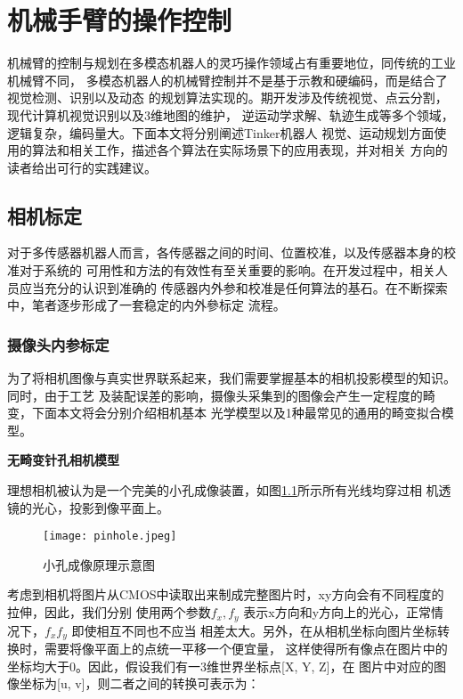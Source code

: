 \chapter{机械手臂的操作控制}
\label{cha:chapter04}

机械臂的控制与规划在多模态机器人的灵巧操作领域占有重要地位，同传统的工业机械臂不同，
多模态机器人的机械臂控制并不是基于示教和硬编码，而是结合了视觉检测、识别以及动态
的规划算法实现的。期开发涉及传统视觉、点云分割，现代计算机视觉识别以及3维地图的维护，
逆运动学求解、轨迹生成等多个领域，逻辑复杂，编码量大。下面本文将分别阐述Tinker机器人
视觉、运动规划方面使用的算法和相关工作，描述各个算法在实际场景下的应用表现，并对相关
方向的读者给出可行的实践建议。

\section{相机标定}

对于多传感器机器人而言，各传感器之间的时间、位置校准，以及传感器本身的校准对于系统的
可用性和方法的有效性有至关重要的影响。在开发过程中，相关人员应当充分的认识到准确的
传感器内外参和校准是任何算法的基石。在不断探索中，笔者逐步形成了一套稳定的内外參标定
流程。

\subsection{摄像头内参标定}
\label{subsec:cam_intrinsic}

为了将相机图像与真实世界联系起来，我们需要掌握基本的相机投影模型的知识。同时，由于工艺
及装配误差的影响，摄像头采集到的图像会产生一定程度的畸变，下面本文将会分别介绍相机基本
光学模型以及1种最常见的通用的畸变拟合模型。

\noindent \textbf{无畸变针孔相机模型}

理想相机被认为是一个完美的小孔成像装置，如图\ref{fig:pinhole}所示所有光线均穿过相
机透镜的光心，投影到像平面上。

\begin{figure}[h] %
  \centering
  \texttt{[image: pinhole.jpeg]}
  \caption{小孔成像原理示意图}
  \label{fig:pinhole}
\end{figure}

考虑到相机将图片从CMOS中读取出来制成完整图片时，xy方向会有不同程度的拉伸，因此，我们分别
使用两个参数$f_x, f_y$ 表示x方向和y方向上的光心，正常情况下，$f_x f_y$ 即使相互不同也不应当
相差太大。另外，在从相机坐标向图片坐标转换时，需要将像平面上的点统一平移一个便宜量，
这样使得所有像点在图片中的坐标均大于0。因此，假设我们有一3维世界坐标点[X, Y, Z]，在
图片中对应的图像坐标为[u, v]，则二者之间的转换可表示为：

